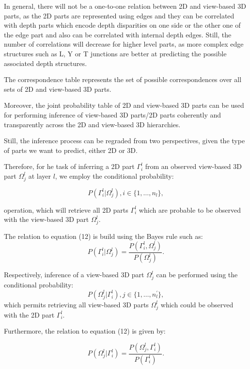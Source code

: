 \documentclass[runningheads]{llncs}
\begin{document}
In general, there will not be a one-to-one relation between 2D and view-based 3D parts, as the 2D parts are represented using edges and they can be correlated with depth parts which encode depth disparities on one side or the other one of the edge part and also can be correlated with internal depth edges. Still, the number of correlations will decrease for higher level parts, as more complex edge structures such as L, Y or T junctions are better at predicting the possible associated depth structures.

The correspondence table represents the set of possible correspondences over all sets of 2D and view-based 3D parts.  

Moreover, the joint probability table of 2D and view-based 3D parts can be used for performing inference of view-based 3D parts/2D parts coherently and transparently across the 2D and view-based 3D hierarchies.

Still, the inference process can be regraded from two perspectives, given the type of parts we want to predict, either 2D or 3D. 

Therefore, for he task of inferring a 2D part $\Gamma_i^l$ from an observed view-based 3D part $\Omega_j^l$ at layer $l$, we employ the conditional probability:

\begin{equation}
P(\Gamma_i^l \vert \Omega_j^l), i \in \{1,\dots,n_l\},
\end{equation}

operation, which will retrieve all 2D parts $\Gamma_i^l$ which are probable to be observed with the view-based 3D part $\Omega_j^l$. 

The relation to equation (12) is build using the Bayes rule such as:
\begin{equation}
P(\Gamma_i^l \vert \Omega_j^l)= \frac{P(\Gamma_i^l,\Omega_j^l)}{P(\Omega_j^l)}.
\end{equation}

Respectively, inference of a view-based 3D part $\Omega_j^l$ can be performed using the conditional probability:
\begin{equation}
 P(\Omega_j^l \vert \Gamma_i^l), j \in \{1,\dots,n_{l}^{'}\},
\end{equation} 
which permits retrieving all view-based 3D parts $\Omega_j^l$ which could be observed with the 2D part $\Gamma_i^l$. 

Furthermore, the relation to equation (12) is given by:

\begin{equation}
 P(\Omega_j^l \vert \Gamma_i^l)=\frac{P(\Omega_j^l,\Gamma_i^l)}{P(\Gamma_i^l)}.
\end{equation} 
 
\end{document}
